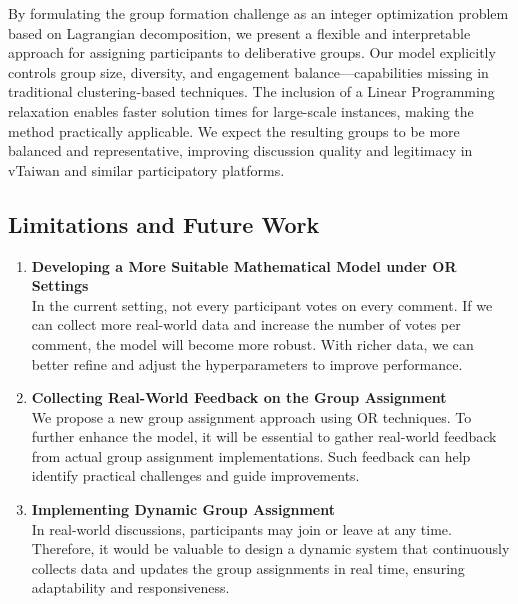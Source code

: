 By formulating the group formation challenge as an integer optimization problem based on Lagrangian decomposition,
we present a flexible and interpretable approach for assigning participants to deliberative groups.
Our model explicitly controls group size, diversity,
and engagement balance—capabilities missing in traditional clustering-based techniques.
The inclusion of a Linear Programming relaxation enables faster solution times for large-scale instances,
making the method practically applicable.
We expect the resulting groups to be more balanced and representative, improving discussion quality
and legitimacy in vTaiwan and similar participatory platforms.

\subsection*{Limitations and Future Work}
\begin{enumerate}
    \item \textbf{Developing a More Suitable Mathematical Model under OR Settings} \\
    In the current setting, not every participant votes on every comment. If we can collect more real-world data and increase the number of votes per comment, the model will become more robust. With richer data, we can better refine and adjust the hyperparameters to improve performance.

    \item \textbf{Collecting Real-World Feedback on the Group Assignment} \\
    We propose a new group assignment approach using OR techniques. To further enhance the model, it will be essential to gather real-world feedback from actual group assignment implementations. Such feedback can help identify practical challenges and guide improvements.

    \item \textbf{Implementing Dynamic Group Assignment} \\
    In real-world discussions, participants may join or leave at any time. Therefore, it would be valuable to design a dynamic system that continuously collects data and updates the group assignments in real time, ensuring adaptability and responsiveness.
\end{enumerate}
